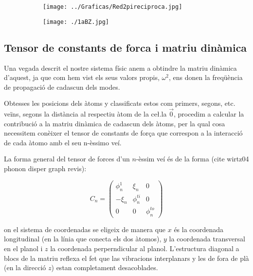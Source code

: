 \documentclass[12pt,twoside,a4paper]{article}%
\begin{document}
\begin{figure}[h]
\centering
\begin{subfigure}[b]{0.4\textwidth}
\texttt{[image: ../Graficas/Red2pireciproca.jpg]}
\end{subfigure}
\begin{subfigure}[b]{0.4\textwidth}
\texttt{[image: ./1aBZ.jpg]}
\end{subfigure}
\end{figure}





\subsection{Tensor de constants de forca i matriu dinàmica}

Una vegada descrit el nostre sistema físic anem a obtindre la matriu dinàmica d'aquest, ja que com hem vist els seus valors propis, $\omega^2$, ens donen la freqüència de propagació de cadascun dels modes.

Obtesses les posicions dels àtoms y classificats estos com primers, segons, etc. veïns, segons la distància al respectiu àtom de la ce\l.la $\vec 0$, procedim a calcular la contribució a la matriu dinàmica de cadascun dels àtoms, per la qual cosa necessitem conèixer el tensor de constants de for\c{c}a que correspon a la interacció de cada àtomo amb el seu n-èssimo veí.

La forma general del tensor de forces d'un $n$-èssim veí és de la forma (cite wirtz04 phonon disper graph revis): 


\begin{equation}
C_n=\begin{pmatrix}
\phi_n^1&\xi_n &0\\
-\xi_n & \phi_n^{ti} & 0 \\
0 & 0 & \phi_n^{to}
\end{pmatrix}
\label{eq:tensordeforces}
\end{equation}

on el sistema de coordenadas se eligeix de manera que $x$ és la coordenada longitudinal (en la línia que conecta els dos àtomos), $y$ la coordenada transversal en el planol i $z$ la coordenada perperndicular al planol. L'estructura diagonal a blocs de la matriu reflexa el fet que las vibracions interplanars y les de fora de plà (en la direcció $z$) estan completament desacoblades.
\end{document}
